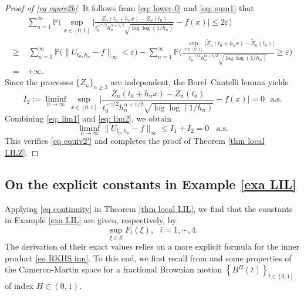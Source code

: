 \documentclass[11pt, reqno]{amsart}
\numberwithin{equation}{section}
\newcommand{\1}{{\bf 1}}
\newcommand{\2}{{\bf 2}}
\begin{document}
\begin{proof}[Proof of \eqref{eq equiv2b}]
It follows from \eqref{eq: lower-0} and \eqref{eq: sum1} that
\begin{align*}
&\sum_{n=1}^{\infty}\mathbb P\Bigg(\sup_{x\in [0,1]}\bigg|\frac{   Z_n(t_0+h_nx)- Z_n(t_0)   }{ t_0^{-\gamma/2}
h_n^{\alpha+1/2}\sqrt{\log\log (1/h_n)}}  -f(x)\bigg|  \le  2\varepsilon\Bigg)\\
 \ge &\,   \sum_{n=1}^{\infty}\mathbb P\big(\|U_{t_0, h_n}-f\|_{\infty}<\varepsilon \big)-
\sum_{n=1}^{\infty} \mathbb P\Bigg(\frac{\sup_{x\in [0,1]}\bigg|\widetilde{Z}_n(t_0+h_nx)-\widetilde{Z}_n(t_0)\bigg|   }
{ t_0^{-\gamma/2}h_n^{\alpha+1/2}\sqrt{\log\log( 1/h_n)}} \ge \varepsilon\Bigg)\\
 =\, & +\infty.
\end{align*}
Since the processes $\{Z_n\}_{n\ge3}$ are   independent,   the Borel--Cantelli lemma yields
\begin{equation}\label{eq: lim2}
I_2:=\liminf_{n\rightarrow\infty} \sup_{x\in [0,1]} \bigg|\frac{   Z_n(t_0+h_nx)- Z_n(t_0)  }
{ t_0^{-\gamma/2}h_n^{\alpha+1/2}\sqrt{\log\log (1/h_n)}}-f(x)\bigg|=0 \ \ \ \text{a.s.}
\end{equation}
 Combining  \eqref{eq: lim1} and \eqref{eq: lim2}, we  obtain
\begin{equation*}%
 \liminf_{n\rightarrow\infty} \|U_{t_0, h_n}-f\|_{\infty}\le I_1+I_2=0\ \ \ \ \text{a.s.}
\end{equation*}
This verifies \eqref{eq equiv2'} and completes the proof of Theorem \ref{thm local LILZ}. 
    \end{proof}
 
 
\subsection{ {On the  explicit constants in Example \ref{exa LIL}} }\label{subsection RKHS} 
 {
Applying  \eqref{eq continuity} in Theorem \ref{thm local LIL}, we find that  the   constants in  Example \ref{exa LIL} are given,  
respectively, by
$$
\sup_{\xi\in \mathcal S}F_i(\xi), \ \ \ i=1, \cdots, 4.
$$  
The derivation of their exact values relies on a more explicit formula for the inner product \eqref{eq RKHS inn}.  To this end, we first 
recall from  \cite[Chapter 6.1]{BHOZ} and \cite{DU99}   some properties of the Cameron-Martin space for a fractional Brownian motion 
$\left\{B^H(t)\right\}_{t\in [0,1]}$ of index $H\in (0,1)$. }
\end{document}

